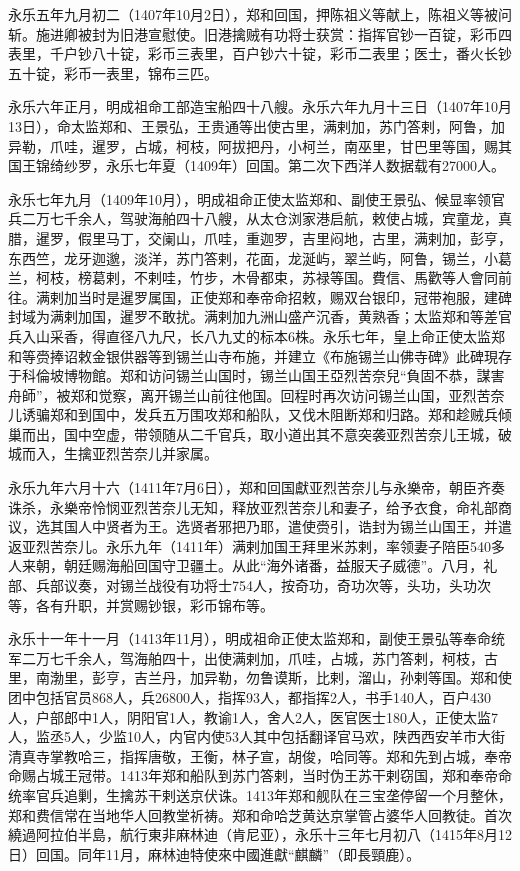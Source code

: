 永乐五年九月初二（1407年10月2日），郑和回国，押陈祖义等献上，陈祖义等被问斩。施进卿被封为旧港宣慰使。旧港擒贼有功将士获赏：指挥官钞一百锭，彩币四表里，千户钞八十锭，彩币三表里，百户钞六十锭，彩币二表里；医士，番火长钞五十锭，彩币一表里，锦布三匹。

永乐六年正月，明成祖命工部造宝船四十八艘。永乐六年九月十三日（1407年10月13日），命太监郑和、王景弘，王贵通等出使古里，满剌加，苏门答剌，阿鲁，加异勒，爪哇，暹罗，占城，柯枝，阿拔把丹，小柯兰，南巫里，甘巴里等国，赐其国王锦绮纱罗，永乐七年夏（1409年）回国。第二次下西洋人数据载有27000人。

永乐七年九月（1409年10月），明成祖命正使太监郑和、副使王景弘、候显率领官兵二万七千余人，驾驶海舶四十八艘，从太仓浏家港启航，敕使占城，宾童龙，真腊，暹罗，假里马丁，交阑山，爪哇，重迦罗，吉里闷地，古里，满剌加，彭亨，东西竺，龙牙迦邈，淡洋，苏门答剌，花面，龙涎屿，翠兰屿，阿鲁，锡兰，小葛兰，柯枝，榜葛剌，不剌哇，竹步，木骨都束，苏禄等国。費信、馬歡等人會同前往。满剌加当时是暹罗属国，正使郑和奉帝命招敕，赐双台银印，冠带袍服，建碑封域为满剌加国，暹罗不敢扰。满剌加九洲山盛产沉香，黄熟香；太监郑和等差官兵入山采香，得直径八九尺，长八九丈的标本6株。永乐七年，皇上命正使太监郑和等赍捧诏敕金银供器等到锡兰山寺布施，并建立《布施锡兰山佛寺碑》此碑現存于科倫坡博物館。郑和访问锡兰山国时，锡兰山国王亞烈苦奈兒“負固不恭，謀害舟師”，被郑和觉察，离开锡兰山前往他国。回程时再次访问锡兰山国，亚烈苦奈儿诱骗郑和到国中，发兵五万围攻郑和船队，又伐木阻断郑和归路。郑和趁贼兵倾巢而出，国中空虚，带领随从二千官兵，取小道出其不意突袭亚烈苦奈儿王城，破城而入，生擒亚烈苦奈儿并家属。

永乐九年六月十六（1411年7月6日），郑和回国獻亚烈苦奈儿与永樂帝，朝臣齐奏诛杀，永樂帝怜悯亚烈苦奈儿无知，释放亚烈苦奈儿和妻子，给予衣食，命礼部商议，选其国人中贤者为王。选贤者邪把乃耶，遣使赍引，诰封为锡兰山国王，并遣返亚烈苦奈儿。永乐九年（1411年）满剌加国王拜里米苏剌，率领妻子陪臣540多人来朝，朝廷赐海船回国守卫疆土。从此“海外诸番，益服天子威德”。八月，礼部、兵部议奏，对锡兰战役有功将士754人，按奇功，奇功次等，头功，头功次等，各有升职，并赏赐钞银，彩币锦布等。

永乐十一年十一月（1413年11月），明成祖命正使太监郑和，副使王景弘等奉命统军二万七千余人，驾海舶四十，出使满剌加，爪哇，占城，苏门答剌，柯枝，古里，南渤里，彭亨，吉兰丹，加异勒，勿鲁谟斯，比剌，溜山，孙剌等国。郑和使团中包括官员868人，兵26800人，指挥93人，都指挥2人，书手140人，百户430人，户部郎中1人，阴阳官1人，教谕1人，舍人2人，医官医士180人，正使太监7人，监丞5人，少监10人，内官内使53人其中包括翻译官马欢，陕西西安羊市大街清真寺掌教哈三，指挥唐敬，王衡，林子宣，胡俊，哈同等。郑和先到占城，奉帝命赐占城王冠带。1413年郑和船队到苏门答剌，当时伪王苏干剌窃国，郑和奉帝命统率官兵追剿，生擒苏干剌送京伏诛。1413年郑和舰队在三宝垄停留一个月整休，郑和费信常在当地华人回教堂祈祷。郑和命哈芝黄达京掌管占婆华人回教徒。首次繞過阿拉伯半島，航行東非麻林迪（肯尼亚），永乐十三年七月初八（1415年8月12日）回国。同年11月，麻林迪特使來中國進獻“麒麟”（即長頸鹿）。

